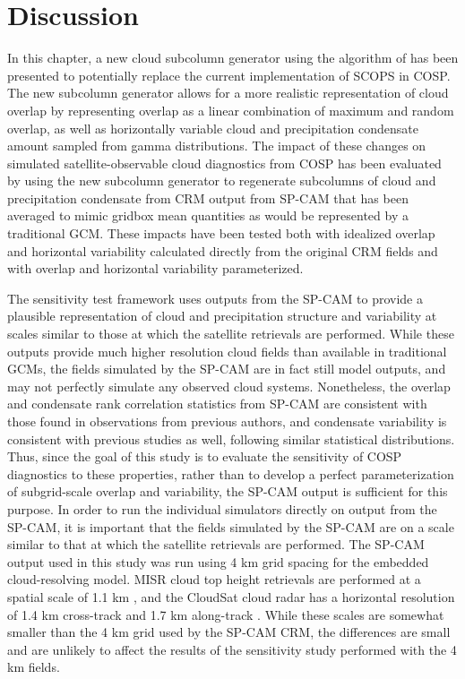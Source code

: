 \section{Discussion}\label{sec:subgrid2Discussion}

In this chapter, a new cloud subcolumn generator using the algorithm of
\citet{raisanen_et_al_2004} has been presented to potentially replace
the current implementation of SCOPS in COSP. The new subcolumn generator
allows for a more realistic representation of cloud overlap by
representing overlap as a linear combination of maximum and random
overlap, as well as horizontally variable cloud and precipitation
condensate amount sampled from gamma distributions. The impact of these
changes on simulated satellite-observable cloud diagnostics from COSP
has been evaluated by using the new subcolumn generator to regenerate
subcolumns of cloud and precipitation condensate from CRM output from
SP-CAM that has been averaged to mimic gridbox mean quantities as would
be represented by a traditional GCM. These impacts have been tested both
with idealized overlap and horizontal variability calculated directly
from the original CRM fields and with overlap and horizontal variability
parameterized.

The sensitivity test framework uses outputs from the SP-CAM to provide a
plausible representation of cloud and precipitation structure and
variability at scales similar to those at which the satellite retrievals
are performed. While these outputs provide much higher resolution cloud
fields than available in traditional GCMs, the fields simulated by the
SP-CAM are in fact still model outputs, and may not perfectly simulate
any observed cloud systems. Nonetheless, the overlap and condensate rank
correlation statistics from SP-CAM are consistent with those found in
observations from previous authors, and condensate variability is
consistent with previous studies as well, following similar statistical
distributions. Thus, since the goal of this study is to evaluate the
sensitivity of COSP diagnostics to these properties, rather than to
develop a perfect parameterization of subgrid-scale overlap and
variability, the SP-CAM output is sufficient for this purpose. In order
to run the individual simulators directly on output from the SP-CAM, it
is important that the fields simulated by the SP-CAM are on a scale
similar to that at which the satellite retrievals are performed. The
SP-CAM output used in this study was run using 4 km grid spacing for the
embedded cloud-resolving model. MISR cloud top height retrievals are
performed at a spatial scale of 1.1 km \citep{moroney_et_al_2002}, and
the CloudSat cloud radar has a horizontal resolution of 1.4 km
cross-track and 1.7 km along-track \citep{tanelli_et_al_2008}. While
these scales are somewhat smaller than the 4 km grid used by the SP-CAM
CRM, the differences are small and are unlikely to affect the results of
the sensitivity study performed with the 4 km fields.

